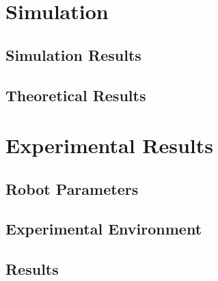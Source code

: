 \documentclass[journal]{IEEEtran}
\begin{document}
\section{Simulation}

\subsection{Simulation Results}
\subsection{Theoretical Results}


\section{Experimental Results}
\subsection{Robot Parameters}
\subsection{Experimental Environment}
\subsection{Results}


%
\end{document}
